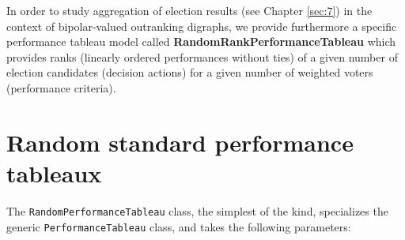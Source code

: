 In order to study aggregation of election results (see Chapter \ref{sec:7}) in the context of bipolar-valued outranking digraphs, we provide furthermore a specific performance tableau model called \textbf{RandomRankPerformanceTableau} which provides ranks (linearly ordered performances without ties) of a given number of election candidates (decision actions) for a given number of weighted voters (performance criteria).
 
\section{Random standard performance tableaux}
\label{sec:6.2}
    
The {\tt RandomPerformanceTableau} class, the simplest of the kind, specializes the generic {\tt PerformanceTableau} class, and takes the following parameters:
